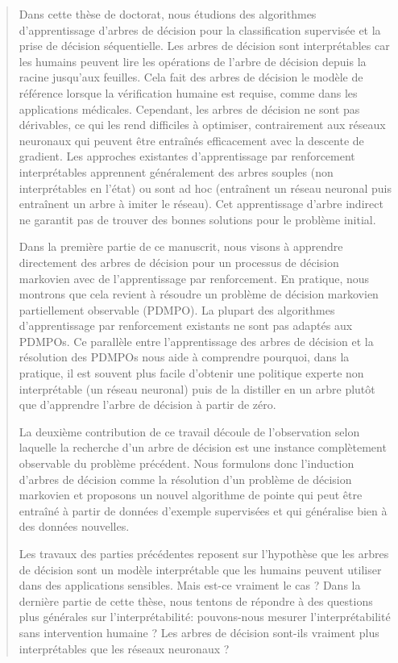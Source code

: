 \begin{abstract}
  Dans cette thèse de doctorat, nous étudions des algorithmes d'apprentissage d'arbres de décision pour la classification supervisée et la prise de décision séquentielle. Les arbres de décision sont interprétables car les humains peuvent lire les opérations de l'arbre de décision depuis la racine jusqu'aux feuilles. Cela fait des arbres de décision le modèle de référence lorsque la vérification humaine est requise, comme dans les applications médicales. Cependant, les arbres de décision ne sont pas dérivables, ce qui les rend difficiles à optimiser, contrairement aux réseaux neuronaux qui peuvent être entraînés efficacement avec la descente de gradient. Les approches existantes d'apprentissage par renforcement interprétables apprennent généralement des arbres souples (non interprétables en l'état) ou sont ad hoc (entraînent un réseau neuronal puis entraînent un arbre à imiter le réseau). Cet apprentissage d'arbre indirect ne garantit pas de trouver des bonnes solutions pour le problème initial.

  Dans la première partie de ce manuscrit, nous visons à apprendre directement des arbres de décision pour un processus de décision markovien avec de l'apprentissage par renforcement. En pratique, nous montrons que cela revient à résoudre un problème de décision markovien partiellement observable (PDMPO). La plupart des algorithmes d'apprentissage par renforcement existants ne sont pas adaptés aux PDMPOs. Ce parallèle entre l'apprentissage des arbres de décision et la résolution des PDMPOs nous aide à comprendre pourquoi, dans la pratique, il est souvent plus facile d'obtenir une politique experte non interprétable (un réseau neuronal) puis de la distiller en un arbre plutôt que d'apprendre l'arbre de décision à partir de zéro.

  La deuxième contribution de ce travail découle de l'observation selon laquelle la recherche d'un arbre de décision est une instance complètement observable du problème précédent. Nous formulons donc l'induction d'arbres de décision comme la résolution d'un problème de décision markovien et proposons un nouvel algorithme de pointe qui peut être entraîné à partir de données d'exemple supervisées et qui généralise bien à des données nouvelles.

  Les travaux des parties précédentes reposent sur l'hypothèse que les arbres de décision sont un modèle interprétable que les humains peuvent utiliser dans des applications sensibles. Mais est-ce vraiment le cas ? Dans la dernière partie de cette thèse, nous tentons de répondre à des questions plus générales sur l'interprétabilité: pouvons-nous mesurer l'interprétabilité sans intervention humaine ? Les arbres de décision sont-ils vraiment plus interprétables que les réseaux neuronaux ?

\end{abstract}
